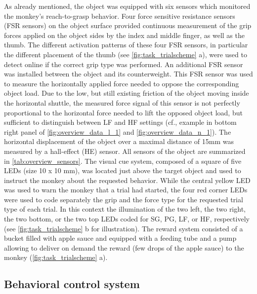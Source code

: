 {As already mentioned, the object was equipped with six sensors which monitored the monkey's reach-to-grasp behavior. Four force sensitive resistance sensors (FSR sensors) on the object surface provided continuous measurement of the grip forces applied on the object sides by the index and middle finger, as well as the thumb. The different activation patterns of these four FSR sensors, in particular the different placement of the thumb (see \cref{fig:task_trialscheme} a), were used to detect online if the correct grip type was performed. An additional FSR sensor was installed between the object and its counterweight. This FSR sensor was used to measure the horizontally applied force needed to oppose the corresponding object load. Due to the low, but still existing friction of the object moving inside the horizontal shuttle, the measured force signal of this sensor is not perfectly proportional to the horizontal force needed to lift the opposed object load, but sufficient to distinguish between LF and HF settings (cf., example in bottom right panel of \cref{fig:overview_data_l_1} and \cref{fig:overview_data_n_1}). The horizontal displacement of the object over a maximal distance of 15mm was measured by a hall-effect (HE) sensor. All sensors of the object are summarized in \cref{tab:overview_sensors}. The visual cue system, composed of a square of five LEDs (size 10 x 10 mm), was located just above the target object and used to instruct the monkey about the requested behavior. While the central yellow LED was used to warn the monkey that a trial had started, the four red corner LEDs were used to code separately the grip and the force type for the requested trial type of each trial. In this context the illumination of the two left, the two right, the two bottom, or the two top LEDs coded for SG, PG, LF, or HF, respectively (see \cref{fig:task_trialscheme} b for illustration). The reward system consisted of a bucket filled with apple sauce and equipped with a feeding tube and a pump allowing to deliver on demand the reward (few drops of the apple sauce) to the monkey (\cref{fig:task_trialscheme} a).

\subsection{Behavioral control system}
\label{sec:behavioral_control_system}

}
